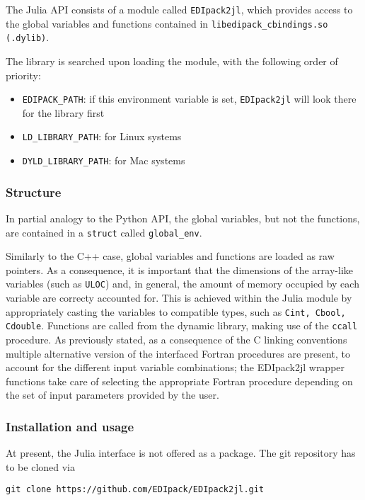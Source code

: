 \documentclass[edipack_sp.tex]{subfiles}
\begin{document}
The \NAME{} Julia API consists of a module called {\tt EDIpack2jl}, which provides access to the global variables and functions contained in {\tt  libedipack\_cbindings.so (.dylib)}. 

The library is searched upon loading the module, with the following order of priority:

\begin{itemize}
\item {\tt EDIPACK\_PATH}: if this environment variable is set, {\tt EDIpack2jl} will look there for the library first
\item {\tt LD\_LIBRARY\_PATH}: for Linux systems
\item {\tt DYLD\_LIBRARY\_PATH}: for Mac systems
\end{itemize}

\subsubsection{Structure}

In partial analogy to the Python API, the global variables, but not the functions, are contained in a  {\tt struct} called {\tt global\_env}.

Similarly to the C++ case, global variables and functions are loaded as raw pointers. As a consequence, it is important that the dimensions of the array-like variables (such as {\tt ULOC}) and, in general, the amount of memory occupied by each variable are correcty accounted for. This is achieved within the Julia module by appropriately casting the variables to compatible types, such as {\tt  Cint, Cbool, Cdouble}.
Functions are called from the dynamic library, making use of the {\tt  ccall} procedure. As previously stated, as a consequence of the C linking conventions multiple alternative version of the interfaced Fortran procedures are present, to account for the different input variable combinations; the EDIpack2jl wrapper functions take care of selecting the appropriate Fortran procedure depending on the set of input parameters provided by the user.

\subsubsection{Installation and usage}

At present, the \NAME Julia interface is not offered as a package. The git repository has to be cloned via

\begin{lstlisting}[style=mybash]
git clone https://github.com/EDIpack/EDIpack2jl.git
\end{lstlisting}
\end{document}
